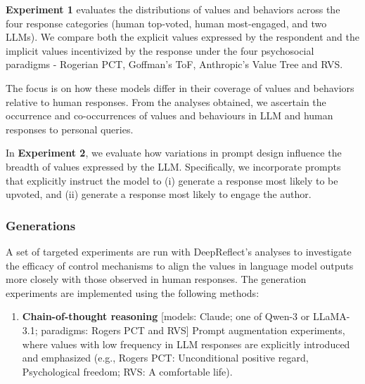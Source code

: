 \textbf{Experiment 1} evaluates the distributions of values and behaviors across the four response categories (human top-voted, human most-engaged, and two LLMs). We compare both the explicit values expressed by the respondent and the implicit values incentivized by the response under the four psychosocial paradigms - Rogerian PCT, Goffman’s ToF, Anthropic’s Value Tree and RVS.


The focus is on how these models differ in their coverage of values and behaviors relative to human responses. From the analyses obtained, we ascertain the occurrence and co-occurrences of values and behaviours in LLM and human responses to personal queries.


In \textbf{Experiment 2}, we evaluate how variations in prompt design influence the breadth of values expressed by the LLM. Specifically, we incorporate prompts that explicitly instruct the model to (i) generate a response most likely to be upvoted, and (ii) generate a response most likely to engage the author.


\subsubsection{Generations}
A set of targeted experiments are run with DeepReflect’s analyses to investigate the efficacy of control mechanisms to align the values in language model outputs more closely with those observed in human responses. The generation experiments are implemented using the following methods:

\begin{enumerate}

    \item \textbf{Chain-of-thought reasoning} [models: Claude; one of Qwen-3 or LLaMA-3.1; paradigms: Rogers PCT and RVS]
Prompt augmentation experiments, where values with low frequency in LLM responses are explicitly introduced and emphasized (e.g., Rogers PCT: Unconditional positive regard, Psychological freedom; RVS: A comfortable life).
\end{enumerate}

    
